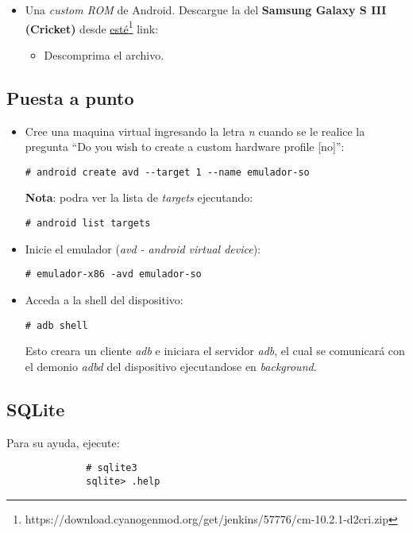\begin{itemize}
 \item Una \textit{custom ROM} de Android. Descargue la del \textbf{Samsung Galaxy S III (Cricket)} desde \href{https://download.cyanogenmod.org/get/jenkins/57776/cm-10.2.1-d2cri.zip}{esté}\footnote{https://download.cyanogenmod.org/get/jenkins/57776/cm-10.2.1-d2cri.zip} link:
 \begin{itemize}
      \item Descomprima el archivo.
 \end{itemize} 
\end{itemize}


\subsection{Puesta a punto}
\begin{itemize}
    \item Cree una maquina virtual ingresando la letra \textit{n} cuando se le realice la pregunta ``Do you wish to create a custom hardware profile [no]'':
    \begin{lstlisting}
# android create avd --target 1 --name emulador-so
    \end{lstlisting}
    \textbf{Nota}: podra ver la lista de \textit{targets} ejecutando:
    \begin{lstlisting}
# android list targets
    \end{lstlisting}
    
    \item Inicie el emulador (\textit{avd - android virtual device}):
    \begin{lstlisting}
# emulador-x86 -avd emulador-so
    \end{lstlisting}

    \item Acceda a la shell del dispositivo:
    \begin{lstlisting}
# adb shell
    \end{lstlisting}
    Esto creara un cliente \textit{adb} e iniciara el servidor \textit{adb}, el cual se comunicará con el demonio \textit{adbd} del dispositivo ejecutandose en \textit{background}.
\end{itemize}

\subsection{SQLite}
Para su ayuda, ejecute:
\begin{lstlisting}
		      # sqlite3
		      sqlite> .help
\end{lstlisting}

